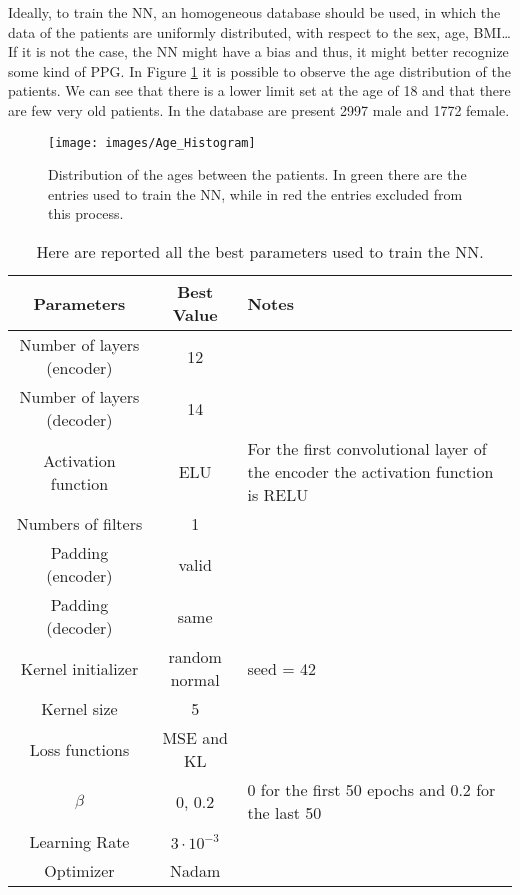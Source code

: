 \documentclass[12pt,a4paper,twocolumn]{article}
\begin{document}
			Ideally, to train the NN, an homogeneous database should be used, in which the data of the patients are uniformly distributed, with respect to the sex, age, BMI\dots If it is not the case, the NN might have a bias and thus, it might better recognize some kind of PPG. In Figure \ref{fig:agehistogram} it is possible to observe the age distribution of the patients. We can see that there is a lower limit set at the age of 18 and that there are few very old patients.
			In the database are present 2997 male and 1772 female.
			\begin{figure}
				\centering
				\texttt{[image: images/Age\_Histogram]}
				\caption{Distribution of the ages between the patients. In green there are the entries used to train the NN, while in red the entries excluded from this process. }
				\label{fig:agehistogram}
			\end{figure}
				\begin{table*}[h!]
				\centering
				\begin{tabular}{|c|c|L|}
					\hline
					\rule[-1ex]{0pt}{2.5ex} \textbf{Parameters} & \textbf{Best Value} & \textbf{Notes}\\
					\hline
					\rule[-1ex]{0pt}{2.5ex} Number of layers (encoder) & 12 & \\
					\rule[-1ex]{0pt}{2.5ex} Number of layers (decoder) & 14 &\\
					\rule[-1ex]{0pt}{2.5ex} Activation function & ELU  & For the first convolutional layer of the encoder the activation function is RELU\\
					\rule[-1ex]{0pt}{2.5ex} Numbers of filters & 1  & \\
					\rule[-1ex]{0pt}{2.5ex} Padding (encoder)& valid &  \\
					\rule[-1ex]{0pt}{2.5ex} Padding (decoder)& same &  \\
					\rule[-1ex]{0pt}{2.5ex} Kernel initializer & random normal  & seed = 42 \\
					\rule[-1ex]{0pt}{2.5ex} Kernel size & 5 &\\
					\rule[-1ex]{0pt}{2.5ex}  Loss functions & MSE and KL &\\
					\rule[-1ex]{0pt}{2.5ex} $\beta$ &  $0$, $0.2$  & $0$ for the first 50 epochs and $0.2$ for the last 50  \\
					\rule[-1ex]{0pt}{2.5ex} Learning Rate & $3\cdot 10^{-3} $&\\
					\rule[-1ex]{0pt}{2.5ex} Optimizer & Nadam &\\
					\hline
					
				\end{tabular}
				\caption{Here are reported all the best parameters used to train the NN.}
				\label{tab:parameters}
			\end{table*}
\end{document}
